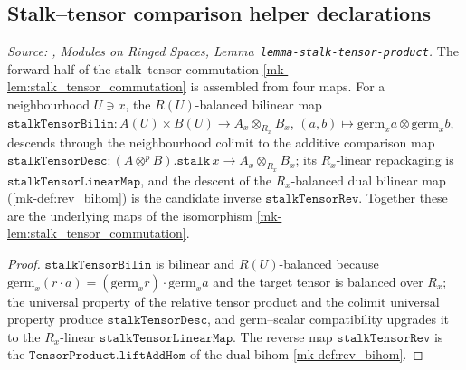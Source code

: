 \subsection{Stalk--tensor comparison helper declarations}
\label{mk-subsec:tensorobj_stalktensor_helpers}


\begin{definition}
  \label{mk-def:stalk_tensor_desc}

  \textit{Source: \cite{stacks-project}, Modules on Ringed Spaces,
  Lemma~\texttt{lemma-stalk-tensor-product}.}
  The forward half of the stalk--tensor commutation \ref{mk-lem:stalk_tensor_commutation}
  is assembled from four maps. For a neighbourhood \(U \ni x\), the \(R(U)\)-balanced
  bilinear map \(\mathtt{stalkTensorBilin}\colon A(U) \times B(U) \to A_x \otimes_{R_x}
  B_x\), \((a,b) \mapsto \mathrm{germ}_x a \otimes \mathrm{germ}_x b\), descends through
  the neighbourhood colimit to the additive comparison map \(\mathtt{stalkTensorDesc}
  \colon (A \otimes^{p} B).\mathtt{stalk}\,x \to A_x \otimes_{R_x} B_x\); its
  \(R_x\)-linear repackaging is \(\mathtt{stalkTensorLinearMap}\), and the descent of the
  \(R_x\)-balanced dual bilinear map (\ref{mk-def:rev_bihom}) is the candidate inverse
  \(\mathtt{stalkTensorRev}\). Together these are the underlying maps of the isomorphism
  \ref{mk-lem:stalk_tensor_commutation}.
\end{definition}
\begin{proof}
 \(\mathtt{stalkTensorBilin}\) is bilinear and
  \(R(U)\)-balanced because \(\mathrm{germ}_x(r\cdot a) = (\mathrm{germ}_x r)\cdot
  \mathrm{germ}_x a\) and the target tensor is balanced over \(R_x\); the universal
  property of the relative tensor product and the colimit universal property produce
  \(\mathtt{stalkTensorDesc}\), and germ--scalar compatibility upgrades it to the
  \(R_x\)-linear \(\mathtt{stalkTensorLinearMap}\). The reverse map
  \(\mathtt{stalkTensorRev}\) is the \(\mathtt{TensorProduct.liftAddHom}\) of the dual
  bihom \ref{mk-def:rev_bihom}.
\end{proof}

